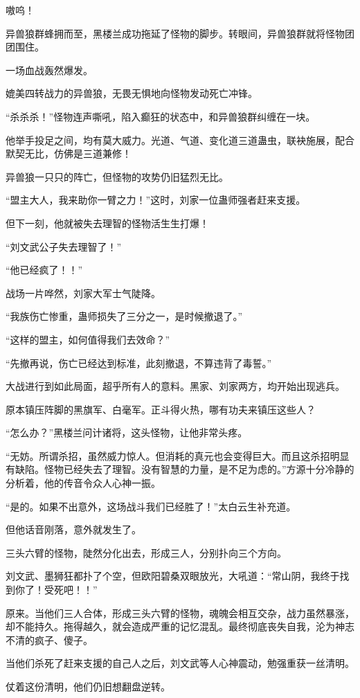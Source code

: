 \begin{this_body}
嗷呜！

异兽狼群蜂拥而至，黑楼兰成功拖延了怪物的脚步。转眼间，异兽狼群就将怪物团团围住。

一场血战轰然爆发。

媲美四转战力的异兽狼，无畏无惧地向怪物发动死亡冲锋。

“杀杀杀！”怪物连声嘶吼，陷入癫狂的状态中，和异兽狼群纠缠在一块。

他举手投足之间，均有莫大威力。光道、气道、变化道三道蛊虫，联袂施展，配合默契无比，仿佛是三道兼修！

异兽狼一只只的阵亡，但怪物的攻势仍旧猛烈无比。

“盟主大人，我来助你一臂之力！”这时，刘家一位蛊师强者赶来支援。

但下一刻，他就被失去理智的怪物活生生打爆！

“刘文武公子失去理智了！”

“他已经疯了！！”

战场一片哗然，刘家大军士气陡降。

“我族伤亡惨重，蛊师损失了三分之一，是时候撤退了。”

“这样的盟主，如何值得我们去效命？”

“先撤再说，伤亡已经达到标准，此刻撤退，不算违背了毒誓。”

大战进行到如此局面，超乎所有人的意料。黑家、刘家两方，均开始出现逃兵。

原本镇压阵脚的黑旗军、白毫军。正斗得火热，哪有功夫来镇压这些人？

“怎么办？”黑楼兰问计诸将，这头怪物，让他非常头疼。

“无妨。所谓杀招，虽然威力惊人。但消耗的真元也会变得巨大。而且这杀招明显有缺陷。怪物已经失去了理智。没有智慧的力量，是不足为虑的。”方源十分冷静的分析着，他的传音令众人心神一振。

“是的。如果不出意外，这场战斗我们已经胜了！”太白云生补充道。

但他话音刚落，意外就发生了。

三头六臂的怪物，陡然分化出去，形成三人，分别扑向三个方向。

刘文武、墨狮狂都扑了个空，但欧阳碧桑双眼放光，大吼道：“常山阴，我终于找到你了！受死吧！！”

原来。当他们三人合体，形成三头六臂的怪物，魂魄会相互交杂，战力虽然暴涨，却不能持久。拖得越久，就会造成严重的记忆混乱。最终彻底丧失自我，沦为神志不清的疯子、傻子。

当他们杀死了赶来支援的自己人之后，刘文武等人心神震动，勉强重获一丝清明。

仗着这份清明，他们仍旧想翻盘逆转。


\end{this_body}

